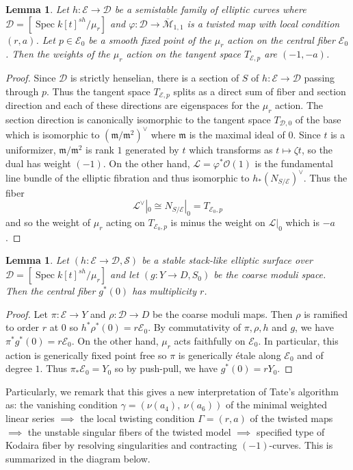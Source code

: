 \documentclass[a4paper,12pt]{amsart}
\newtheorem{lem}[thm]{Lemma}
\theoremstyle{definition}
\newcommand{\cO}{\mathcal{O}}
\newcommand{\cD}{\mathcal{D}}
\newcommand{\cL}{\mathcal{L}}
\newcommand{\cM}{\mathcal{M}}
\newcommand{\cE}{\mathcal{E}}
\newcommand{\cS}{\mathcal{S}}
\DeclareMathOperator{\Spec}{Spec}
\begin{document}
	\begin{lem}\label{lem:tangent:action} Let $h: \cE \to \cD$ be a semistable family of elliptic curves where $\cD = \left[\Spec k[t]^{sh}/\mu_r\right]$ and $\varphi : \cD \to \overline{\cM}_{1,1}$ is a twisted map with local condition $(r,a)$. Let $p \in \cE_0$ be a smooth fixed point of the $\mu_r$ action on the central fiber $\cE_0$. Then the weights of the $\mu_r$ action on the tangent space $T_{\cE,p}$ are $(-1, -a)$.
	\end{lem}
	\begin{proof} Since $\cD$ is strictly henselian, there is a section of $S$ of $h:\cE \to \cD$ passing through $p$. Thus the tangent space $T_{\cE, p}$ splits as a direct sum of fiber and section direction and each of these directions are eigenspaces for the $\mu_r$ action. The section direction is canonically isomorphic to the tangent space $T_{\cD, 0}$ of the base which is isomorphic to $(\mathfrak{m}/\mathfrak{m}^2)^\vee$ where $\mathfrak{m}$ is the maximal ideal of $0$. Since $t$ is a uniformizer, $\mathfrak{m}/\mathfrak{m}^2$ is rank $1$ generated by $t$ which transforms as $t \mapsto \zeta t$, so the dual has weight $(-1)$. On the other hand, $\cL = \varphi^*\cO(1)$ is the fundamental line bundle of the elliptic fibration and thus isomorphic to $h_*(N_{S/\cE})^\vee$. Thus the fiber 
		$$
		\cL^\vee|_0 \cong N_{S/\cE}|_0 = T_{\cE_0, p}
		$$
		and so the weight of $\mu_r$ acting on $T_{\cE_0,p}$ is minus the weight on $\cL|_0$ which is $-a$. 
	\end{proof} 
	
	\begin{lem}\label{lem:mult}
		Let $(h : \cE \to \cD, \cS)$ be a stable stack-like elliptic surface over $\cD = \left[\Spec k[t]^{sh}/\mu_r\right]$ and let $(g : Y \to D, S_0)$ be the coarse moduli space. Then the central fiber $g^*(0)$ has multiplicity $r$. 
	\end{lem}
	\begin{proof}
		Let $\pi : \cE \to Y$ and $\rho : \cD \to D$ be the coarse moduli maps. Then $\rho$ is ramified to order $r$ at $0$ so $h^*\rho^*(0) = r\cE_0$. By commutativity of $\pi, \rho, h$ and $g$, we have $\pi^*g^*(0) = r\cE_0$. On the other hand, $\mu_r$ acts faithfully on $\cE_0$. In particular, this action is generically fixed point free so $\pi$ is generically \'etale along $\cE_0$ and of degree $1$. Thus $\pi_*\cE_0 = Y_0$ so by push-pull, we have $g^*(0) = rY_0$. 
	\end{proof}
	
	Particularly, we remark that this gives a new interpretation of Tate's algorithm as: the vanishing condition $\gamma = (\nu(a_4), ~ \nu(a_6))$ of the minimal weighted linear series $\implies$ the local twisting condition $\Gamma = (r,a)$ of the twisted maps $\implies$ the unstable singular fibers of the twisted model $\implies$ specified type of Kodaira fiber by resolving singularities and contracting $(-1)$-curves. This is summarized in the diagram below.
	
\end{document}
